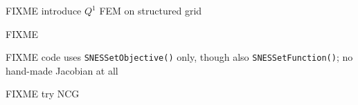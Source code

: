 FIXME introduce $Q^1$ FEM on structured grid

\begin{marginfigure}

\caption{FIXME}
\label{fig:q1hat}
\end{marginfigure}

FIXME code uses \texttt{SNESSetObjective()} only, though also \texttt{SNESSetFunction()}; no hand-made Jacobian at all

FIXME try NCG
